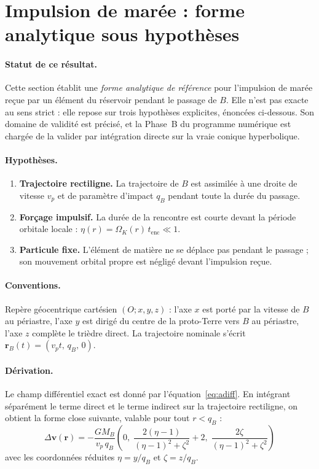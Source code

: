 \documentclass[11pt,a4paper,openany]{report}
\begin{document}
\section{Impulsion de marée : forme analytique sous hypothèses}
\label{app:impulsion}

\paragraph{Statut de ce résultat.}
Cette section établit une \emph{forme analytique de référence} pour l'impulsion de marée reçue par
un élément du réservoir pendant le passage de $B$. Elle n'est pas exacte au sens strict : elle
repose sur trois hypothèses explicites, énoncées ci-dessous. Son domaine de validité est précisé,
et la Phase~B du programme numérique est chargée de la valider par intégration directe sur la vraie
conique hyperbolique.

\paragraph{Hypothèses.}
\begin{enumerate}
\item \textbf{Trajectoire rectiligne.} La trajectoire de $B$ est assimilée à une droite de vitesse
$v_p$ et de paramètre d'impact $q_B$ pendant toute la durée du passage.
\item \textbf{Forçage impulsif.} La durée de la rencontre est courte devant la période orbitale
locale : $\eta(r)=\Omega_K(r)\,t_{\mathrm{enc}}\ll1$.
\item \textbf{Particule fixe.} L'élément de matière ne se déplace pas pendant le passage ; son
mouvement orbital propre est négligé devant l'impulsion reçue.
\end{enumerate}

\paragraph{Conventions.}
Repère géocentrique cartésien $(O;x,y,z)$ : l'axe $x$ est porté par la vitesse de $B$ au périastre,
l'axe $y$ est dirigé du centre de la proto-Terre vers $B$ au périastre, l'axe $z$ complète le trièdre
direct. La trajectoire nominale s'écrit $\mathbf{r}_B(t)=(v_p t,\,q_B,\,0)$.

\paragraph{Dérivation.}
Le champ différentiel exact est donné par l'équation~\eqref{eq:adiff}. En intégrant séparément le
terme direct et le terme indirect sur la trajectoire rectiligne, on obtient la forme close
suivante, valable pour tout $r<q_B$ :
\begin{equation}
\boxed{\;
\Delta\mathbf{v}(\mathbf{r})
=
-\frac{GM_B}{v_p\,q_B}
\left(
0,\;
\frac{2(\eta-1)}{(\eta-1)^2+\zeta^2}+2,\;
\frac{2\zeta}{(\eta-1)^2+\zeta^2}
\right)
\;}
\label{eq:impulsion-close}
\end{equation}
avec les coordonnées réduites $\eta=y/q_B$ et $\zeta=z/q_B$.
\end{document}
